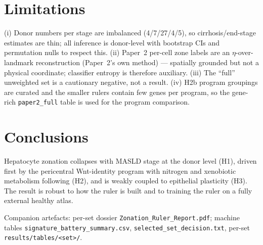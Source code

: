 \documentclass[11pt]{article}
\begin{document}
\section{Limitations}
(i) Donor numbers per stage are imbalanced (4/7/27/4/5), so cirrhosis/end-stage estimates are thin;
all inference is donor-level with bootstrap CIs and permutation nulls to respect this. (ii) Paper~2
per-cell zone labels are an $\eta$-over-landmark reconstruction (Paper~2's own method) --- spatially
grounded but not a physical coordinate; classifier entropy is therefore auxiliary. (iii) The
``full'' unweighted set is a cautionary negative, not a result. (iv) H2b program groupings are
curated and the smaller rulers contain few genes per program, so the gene-rich \texttt{paper2\_full}
table is used for the program comparison.

\section{Conclusions}
Hepatocyte zonation collapses with MASLD stage at the donor level (H1), driven first by the
pericentral Wnt-identity program with nitrogen and xenobiotic metabolism following (H2), and is
weakly coupled to epithelial plasticity (H3). The result is robust to how the ruler is built and to
training the ruler on a fully external healthy atlas.

\vspace{1em}\footnotesize Companion artefacts: per-set dossier \texttt{Zonation\_Ruler\_Report.pdf};
machine tables \texttt{signature\_battery\_summary.csv}, \texttt{selected\_set\_decision.txt},
per-set \texttt{results/tables/<set>/}.
\end{document}
